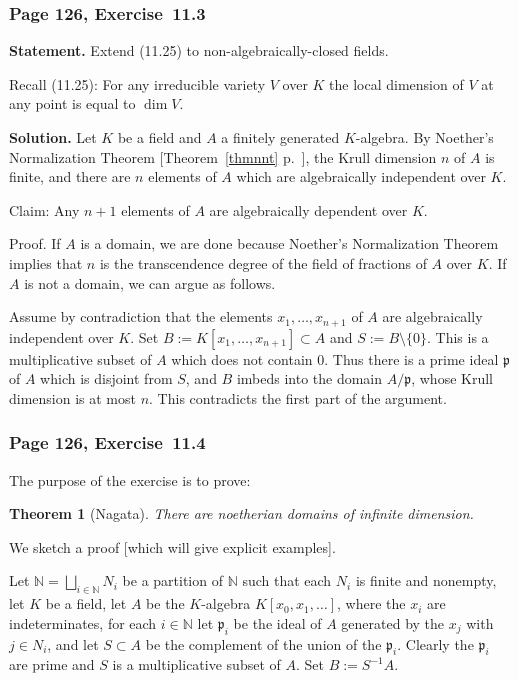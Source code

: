 \documentclass[12pt,letterpaper]{article}%
\newcommand{\mf}{\mathfrak}
\newcommand{\ppp}{\mf p}
\newcommand{\nn}{\noindent}
\newtheorem{thm}{Theorem}%
\begin{document}
\subsubsection{Page 126, Exercise~11.3}\label{113}%

\textbf{Statement.} Extend (11.25) to non-algebraically-closed fields.

Recall (11.25): For any irreducible variety $V$ over $K$ the local dimension of $V$ at any point is equal to $\dim V$.

\nn\textbf{Solution.} Let $K$ be a field and $A$ a finitely generated $K$-algebra. By Noether's Normalization Theorem [Theorem~\ref{thmnnt} p.~\pageref{thmnnt}], %
the Krull dimension $n$ of $A$ is finite, and there are $n$ elements of $A$ which are algebraically independent over $K$. 

\nn Claim: Any $n+1$ elements of $A$ are algebraically dependent over $K$.

\nn Proof. If $A$ is a domain, we are done because Noether's Normalization Theorem implies that $n$ is the transcendence degree of the field of fractions of $A$ over $K$. If $A$ is not a domain, we can argue as follows. 

Assume by contradiction that the elements $x_1,\ldots,x_{n+1}$ of $A$ are algebraically independent over $K$. Set $B:=K[x_1,\ldots,x_{n+1}]\subset A$ and $S:=B\setminus\{0\}$. This is a multiplicative subset of $A$ which does not contain $0$. Thus there is a prime ideal $\ppp$ of $A$ which is disjoint from $S$, and $B$ imbeds into the domain $A/\ppp$, whose Krull dimension is at most $n$. This contradicts the first part of the argument.


\subsubsection{Page 126, Exercise~11.4}%

The purpose of the exercise is to prove:

\begin{thm}[Nagata]
There are noetherian domains of infinite dimension.
\end{thm}

We sketch a proof [which will give explicit examples]. 

Let $\mathbb N=\bigsqcup_{i\in\mathbb N}N_i$ be a partition of $\mathbb N$ such that each $N_i$ is finite and nonempty, let $K$ be a field, let $A$ be the $K$-algebra $K[x_0,x_1,\dots]$, where the $x_i$ are indeterminates, for each $i\in\mathbb N$ let $\ppp_i$ be the ideal of $A$ generated by the $x_j$ with $j\in N_i$, and let $S\subset A$ be the complement of the union of the $\ppp_i$. Clearly the $\ppp_i$ are prime and $S$ is a multiplicative subset of $A$. Set $B:=S^{-1}A$. 
\end{document}
